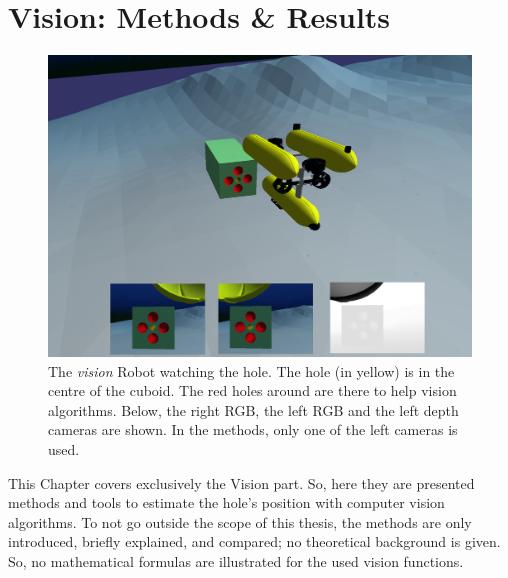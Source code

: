 

\chapter{Vision: Methods \& Results}
\label{chap:vision}
\ifpdf
    \graphicspath{{Vision/Figures/PNG/}{Vision/Figures/PDF/}{Vision/Figures/}}
\else
    \graphicspath{{Vision/Figures/EPS/}{Vision/Figures/}}
\fi

\begin{figure}[H]
	\centering
	\includegraphics[width=13.5cm]{Vision_uwsim.jpeg}
	\caption[The Vision robot watching the hole]{The \textit{vision} Robot watching the hole. The hole (in yellow) is in the centre of the cuboid. The red holes around are there to help vision algorithms. Below, the right RGB, the left RGB and the left depth cameras are shown. In the methods, only one of the left cameras is used.}
	\label{fig:vision-uwsim}
\end{figure}

This Chapter covers exclusively the Vision part. So, here they are presented methods and tools to estimate the hole's position with computer vision algorithms. To not go outside the scope of this thesis, the methods are only introduced, briefly explained, and compared; no theoretical background is given. So, no mathematical formulas are illustrated for the used vision functions. \\

